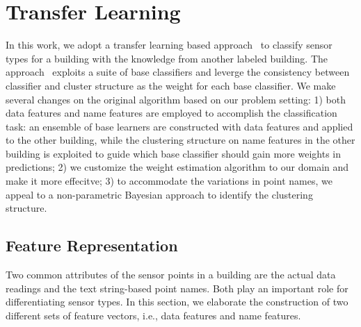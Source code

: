 \section{Transfer Learning}
In this work, we adopt a transfer learning based approach~\cite{lwe} to classify sensor types for a building with the knowledge from another labeled building. The approach~\cite{lwe} exploits a suite of base classifiers and leverge the consistency between classifier and cluster structure as the weight for each base classifier. 
We make several changes on the original algorithm based on our problem setting: 1) both data features and name features are employed to accomplish the classification task: an ensemble of base learners are constructed with data features and applied to the other building, while the clustering structure on name features in the other building is exploited to guide which base classifier should gain more weights in predictions; 2) we customize the weight estimation algorithm to our domain and make it more effecitve; 3) to accommodate the variations in point names, we appeal to a non-parametric Bayesian approach to identify the clustering structure.

\subsection{Feature Representation}\label{feature}
Two common attributes of the sensor points in a building are the actual data readings and the text string-based point names. Both play an important role for differentiating sensor types.
In this section, we elaborate the construction of two different sets of feature vectors, i.e., data features and name features.

